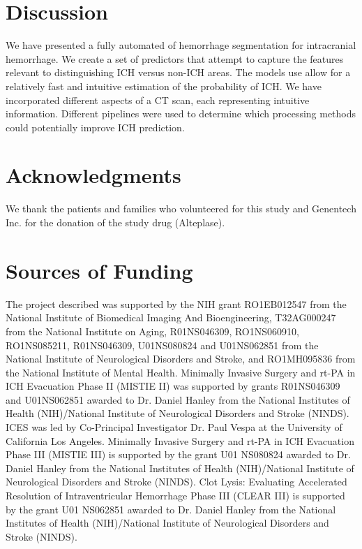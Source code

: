 \documentclass{elsarticle_nonatbib}\usepackage[]{graphicx}\usepackage[]{color}
\begin{document}
\section{Discussion}

We have presented a fully automated of hemorrhage segmentation for intracranial hemorrhage.  We create a set of predictors that attempt to capture the features relevant to distinguishing ICH versus non-ICH areas.
The models use allow for a relatively fast and intuitive estimation of the probability of ICH.  We have incorporated different aspects of a CT scan, each representing intuitive information.  Different pipelines were used to determine which processing methods could potentially improve ICH prediction.



\section*{Acknowledgments}
We thank the patients and families who volunteered for this study and Genentech Inc. for the donation of the study drug (Alteplase).

\section*{Sources of Funding}
The project described was supported by the NIH grant RO1EB012547 from the National Institute of Biomedical Imaging And Bioengineering, T32AG000247 from the National Institute on Aging, R01NS046309, RO1NS060910, RO1NS085211, R01NS046309, U01NS080824 and U01NS062851 from the National Institute of Neurological Disorders and Stroke, and RO1MH095836 from the National Institute of Mental Health. Minimally Invasive Surgery and rt-PA in ICH Evacuation Phase II (MISTIE II) was supported by grants R01NS046309 and U01NS062851 awarded to Dr. Daniel Hanley from the National Institutes of Health (NIH)/National Institute of Neurological Disorders and Stroke (NINDS).  ICES was led by Co-Principal Investigator Dr. Paul Vespa at the University of California Los Angeles. Minimally Invasive Surgery and rt-PA in ICH Evacuation Phase III (MISTIE III) is supported by the grant U01 NS080824 awarded to Dr. Daniel Hanley from the National Institutes of Health (NIH)/National Institute of Neurological Disorders and Stroke (NINDS). Clot Lysis: Evaluating Accelerated Resolution of Intraventricular Hemorrhage Phase III (CLEAR III) is supported by the grant U01 NS062851 awarded to Dr. Daniel Hanley from the National Institutes of Health (NIH)/National Institute of Neurological Disorders and Stroke (NINDS). 
\end{document}
